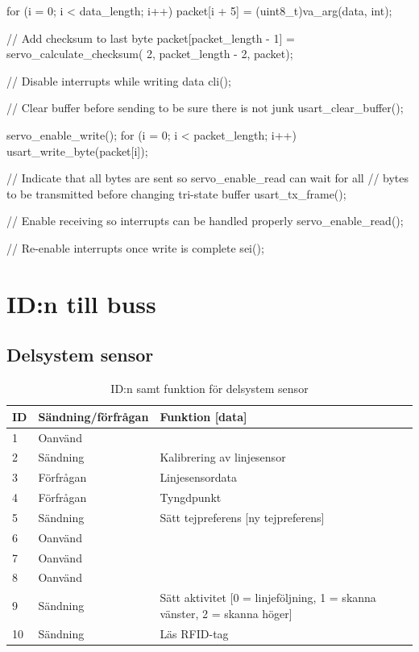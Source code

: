 \begin{listing}{1}
{	for (i = 0; i < data_length; i++) {
		packet[i + 5] = (uint8_t)va_arg(data, int);
	}

	// Add checksum to last byte
	packet[packet_length - 1] = servo_calculate_checksum(
		2, packet_length - 2, packet);

	// Disable interrupts while writing data
	cli();

	// Clear buffer before sending to be sure there is not junk
	usart_clear_buffer();

	servo_enable_write();
	for (i = 0; i < packet_length; i++) {
		usart_write_byte(packet[i]);
	}

	// Indicate that all bytes are sent so servo_enable_read can
	wait for all
	// bytes to be transmitted before changing tri-state buffer
	usart_tx_frame();

	// Enable receiving so interrupts can be handled properly
	servo_enable_read();

	// Re-enable interrupts once write is complete
	sei();
}
\end{listing}

\section{ID:n till buss}
\label{callbacks}
\subsection{Delsystem sensor}

\begin{table}[H]
\centering
\label{callbacks-sensor}
\begin{tabularx}{\textwidth}{|l|l|X|}
\hline
\textbf{ID} & \textbf{Sändning/förfrågan} & \textbf{Funktion [data]} \\ \hline
1 & Oanvänd & \\ \hline
2 & Sändning & Kalibrering av linjesensor \\ \hline
3 & Förfrågan & Linjesensordata \\ \hline
4 & Förfrågan & Tyngdpunkt \\ \hline
5 & Sändning & Sätt tejpreferens [ny tejpreferens] \\ \hline
6 & Oanvänd & \\ \hline
7 & Oanvänd & \\ \hline
8 & Oanvänd & \\ \hline
9 & Sändning & Sätt aktivitet [0 = linjeföljning, 1 = skanna vänster, 2 = skanna höger] \\ \hline
10 & Sändning & Läs RFID-tag \\ \hline
\end{tabularx}
\caption{ID:n samt funktion för delsystem sensor}
\end{table}


